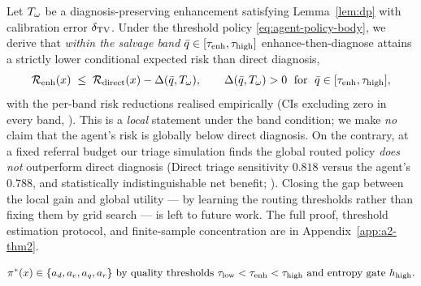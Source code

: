 
\begin{theorem}\label{thm:agent-compact}
Let $T_\omega$ be a diagnosis-preserving enhancement satisfying Lemma~\ref{lem:dp} with calibration
error $\delta_{\mathrm{TV}}$. Under the threshold policy \eqref{eq:agent-policy-body}, we derive that
\emph{within the salvage band} $\bar{q}\in[\tau_{\mathrm{enh}},\tau_{\mathrm{high}}]$ enhance-then-diagnose attains a
strictly lower conditional expected risk than direct diagnosis,
\begin{equation}
\mathcal{R}_{\mathrm{enh}}(x) \;\leq\; \mathcal{R}_{\mathrm{direct}}(x) - \Delta(\bar{q},T_\omega),
\qquad
\Delta(\bar{q},T_\omega) > 0 \;\text{ for }\; \bar{q}\in[\tau_{\mathrm{enh}},\tau_{\mathrm{high}}],
\label{eq:thm2-body}
\end{equation}
with the per-band risk reductions realised empirically (CIs excluding zero in every band,
). This is a \emph{local} statement under the band condition; we make
\emph{no} claim that the agent's risk is globally below direct diagnosis. On the contrary, at
a fixed referral budget our triage simulation finds the global routed policy
\emph{does not} outperform direct diagnosis (Direct triage sensitivity $0.818$ versus the
agent's $0.788$, and statistically indistinguishable net benefit; ). Closing
the gap between the local gain and global utility --- by learning the routing thresholds rather
than fixing them by grid search --- is left to future work. The full proof, threshold
estimation protocol, and finite-sample concentration are in Appendix~\ref{app:a2-thm2}.
\end{theorem}

\begin{equation}
\pi^{*}(x)\in\{\actd,\acte,\actq,\actr\}\ \text{by quality thresholds}\ \taulow<\tauenh<\tauhigh
\ \text{and entropy gate}\ \hhigh.
\label{eq:agent-policy-thm2}
\end{equation}
